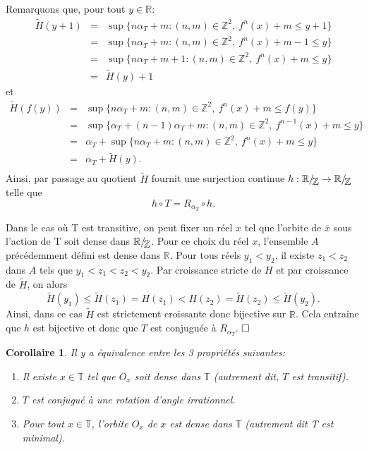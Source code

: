 \documentclass[11pt,a4 paper]{article}
\newtheorem{corollaire}[theoreme]{Corollaire}
\newcommand{\Tbb}{\mathbb{T}}
\newcommand{\Rbb}{\mathbb{R}}
\newcommand*{\EnsembleQuotient}[2]%
{\ensuremath{%
		#1/\!\raisebox{-.65ex}{\ensuremath{\mathcal{#2}}}}}
\newenvironment{coro}{\begin{box_coro}\begin{corollaire}}{\end{corollaire}\end{box_coro}}
\begin{document}
	\par Remarquons que, pour tout $y \in \Rbb$:
		\begin{eqnarray*}
			\widetilde{H}(y+1)&=&\sup \lbrace n \alpha_T +m: (n,m)\in \mathbb{Z}^2,\ f^n(x)+m\leq y+1 \rbrace\\
			&=& \sup \lbrace n \alpha_T +m: (n,m)\in \mathbb{Z}^2,\ f^n(x)+m-1\leq y\rbrace\\
			&=&\sup \lbrace n \alpha_T +m+1: (n,m)\in \mathbb{Z}^2,\ f^n(x)+m\leq y \rbrace \\
			&=&\widetilde{H}(y)+1
		\end{eqnarray*}
	et
		\begin{eqnarray*}
			\widetilde{H}(f(y))&=& \sup \lbrace n \alpha_T + m : (n,m)\in \mathbb{Z}^2,\ f^n(x)+m \leq f(y) \rbrace \\
		     &=& \sup \lbrace \alpha_T + (n-1) \alpha_T + m : (n,m)\in \mathbb{Z}^2,\ f^{n-1}(x)+m \leq y \rbrace \\
		     &=& \alpha_T + \sup \lbrace n \alpha_T + m : (n,m)\in \mathbb{Z}^2,\ f^{n}(x)+m \leq y \rbrace\\
		     &=&\alpha_T + \widetilde{H}(y). \\
		\end{eqnarray*}
	Ainsi, par passage au quotient $\widetilde{H}$ fournit une surjection continue $h: \EnsembleQuotient{\Rbb}{\mathbb{Z}}\to\EnsembleQuotient{\Rbb}{\mathbb{Z}}$ telle que 
	$$h\circ T=R_{\alpha_T} \circ h.$$ 
	
	\par Dans le cas où T est transitive, on peut fixer un réel $x$ tel que l'orbite de $\overline{x}$ sous l'action de T soit dense dans $\EnsembleQuotient{\Rbb}{\mathbb{Z}}$. Pour ce choix du réel $x$, l'ensemble $A$ précédemment défini est dense dans $\Rbb$. Pour tous réels $y_1<y_2$, il existe $z_1<z_2$ dans $A$ tels que $y_1<z_1<z_2<y_2$. Par croissance stricte de $H$ et par croissance de $\widetilde{H}$, on alors $$\widetilde{H}(y_1)\leq \widetilde{H}(z_1)=H(z_1)<H(z_2)=\widetilde{H}(z_2)\leq \widetilde{H}(y_2).$$ 
	Ainsi, dans ce cas $\widetilde{H}$ est strictement croissante donc bijective sur $\Rbb$. Cela entraine que $h$ est bijective et donc que $T$ est conjuguée à $R_{\alpha_T}$. $\hfill \square$\\






\begin{coro}\label{minimal équivaut transitif}
	Il y a équivalence entre les 3 propriétés suivantes:
	\begin{enumerate}
		\item Il existe $x\in \Tbb$ tel que $O_x$ soit dense dans $\Tbb$ (autrement dit, $T$ est transitif).
		\item $T$ est conjugué à une rotation d'angle irrationnel.
		\item Pour tout $x\in \Tbb$, l'orbite $O_x$ de $x$ est dense dans $\Tbb$ (autrement dit T est minimal).
	\end{enumerate}
\end{coro}
\end{document}
